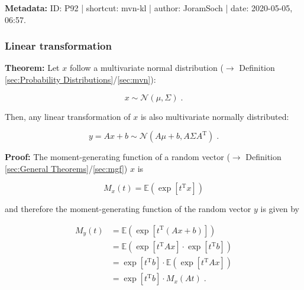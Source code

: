 \documentclass[a4paper,12pt,twoside]{book}
\begin{document}
\vspace{1em}
\textbf{Metadata:} ID: P92 | shortcut: mvn-kl | author: JoramSoch | date: 2020-05-05, 06:57.
\vspace{1em}



\subsubsection[\textbf{Linear transformation}]{Linear transformation} \label{sec:mvn-ltt}
\setcounter{equation}{0}

\textbf{Theorem:} Let $x$ follow a multivariate normal distribution ($\rightarrow$ Definition \ref{sec:Probability Distributions}/\ref{sec:mvn}):

\begin{equation} \label{eq:mvn-ltt-mvn}
x \sim \mathcal{N}(\mu, \Sigma) \; .
\end{equation}

Then, any linear transformation of $x$ is also multivariate normally distributed:

\begin{equation} \label{eq:mvn-ltt-mvn-lt}
y = Ax + b \sim \mathcal{N}(A\mu + b, A \Sigma A^\mathrm{T}) \; .
\end{equation}


\vspace{1em}
\textbf{Proof:} The moment-generating function of a random vector ($\rightarrow$ Definition \ref{sec:General Theorems}/\ref{sec:mgf}) $x$ is

\begin{equation} \label{eq:mvn-ltt-vect-mgf}
M_x(t) = \mathbb{E} \left( \exp \left[ t^\mathrm{T} x \right] \right)
\end{equation}

and therefore the moment-generating function of the random vector $y$ is given by

\begin{equation} \label{eq:mvn-ltt-y-mgf-s1}
\begin{split}
M_y(t) &= \mathbb{E} \left( \exp \left[ t^\mathrm{T} (Ax + b) \right] \right) \\
&= \mathbb{E} \left( \exp \left[ t^\mathrm{T} A x \right] \cdot \exp \left[ t^\mathrm{T} b \right] \right) \\
&= \exp \left[ t^\mathrm{T} b \right] \cdot \mathbb{E} \left( \exp \left[ t^\mathrm{T} A x \right] \right) \\
&= \exp \left[ t^\mathrm{T} b \right] \cdot M_x(At) \; .
\end{split}
\end{equation}
\end{document}
